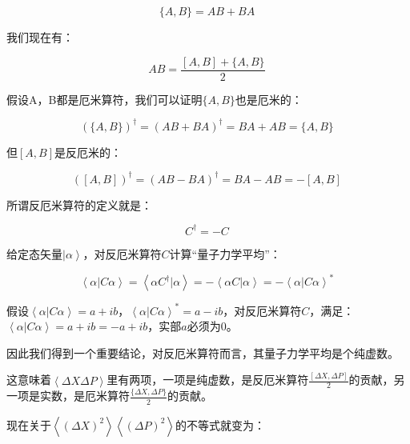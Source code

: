 \begin{equation}
\{ A, B \} = AB + BA~
\end{equation}

我们现在有：

\begin{equation}
AB = \frac{\left[ A, B \right] + \{ A, B \} }{2}~
\end{equation}

假设A，B都是厄米算符，我们可以证明$\{ A, B \}$也是厄米的：

\begin{equation}
\left( \{ A, B \} \right)^\dagger = \left( AB + BA \right)^\dagger = BA + AB = \{ A, B \}~
\end{equation}

但$\left[ A, B \right]$是反厄米的：

\begin{equation}
\left( \left[ A, B \right] \right)^\dagger = \left( AB - BA \right)^\dagger = BA - AB = -  \left[ A, B \right]~
\end{equation}

所谓反厄米算符的定义就是：

\begin{equation}
C^\dagger = -C~
\end{equation}

给定态矢量$\left| \alpha \right\rangle$，对反厄米算符$C$计算“量子力学平均”：

\begin{equation}
\left\langle \alpha | C \alpha \right\rangle = \left\langle \alpha C^\dagger |  \alpha \right\rangle = - \left\langle \alpha C |  \alpha \right\rangle = - \left\langle \alpha | C \alpha \right\rangle^*~
\end{equation}

假设$\left\langle \alpha | C \alpha \right\rangle = a + i b$，$\left\langle \alpha | C \alpha \right\rangle^* = a - i b$，对反厄米算符$C$，满足：$\left\langle \alpha | C \alpha \right\rangle = a + ib = -a + ib$，实部$a$必须为0。

因此我们得到一个重要结论，对反厄米算符而言，其量子力学平均是个纯虚数。

这意味着$\left\langle \Delta X \Delta P \right\rangle$里有两项，一项是纯虚数，是反厄米算符$\frac{\left[ \Delta X, \Delta P \right]}{2}$的贡献，另一项是实数，是厄米算符$\frac{\{ \Delta X, \Delta P \}}{2}$的贡献。

现在关于$\left\langle \left( \Delta X \right)^2  \right\rangle \left\langle \left( \Delta P \right)^2  \right\rangle$的不等式就变为：

